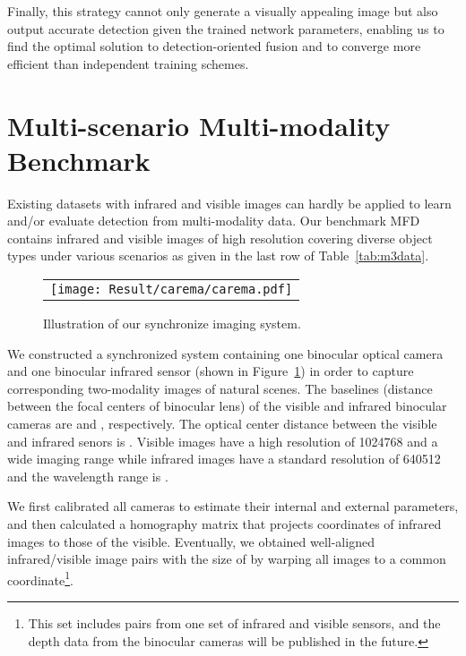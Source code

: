 \documentclass[10pt,twocolumn,letterpaper]{article}
\begin{document}
Finally, this strategy cannot only generate a visually appealing image but also output accurate detection given the trained network parameters, enabling us to find the optimal solution to detection-oriented fusion and to converge more efficient than independent training schemes.

\section{Multi-scenario Multi-modality Benchmark}
Existing datasets with infrared and visible images can hardly be applied to learn and/or evaluate detection from multi-modality data. Our benchmark MFD contains infrared and visible images of high resolution covering diverse object types under various scenarios as given in the last row of Table~\ref{tab:m3data}.
\begin{figure}[!htb]
	\centering
	\setlength{\tabcolsep}{1pt}
	\begin{tabular}{c}
		
		\texttt{[image: Result/carema/carema.pdf]}
		\\ 				
	\end{tabular}
	\vspace{-0.2cm}
	\caption{Illustration of our synchronize imaging system.}
	\label{fig:SYSTEM}
\end{figure}

We constructed a synchronized system containing one binocular optical camera and one binocular infrared sensor (shown in Figure~\ref{fig:SYSTEM}) in order to capture corresponding two-modality images of natural scenes. The baselines (distance between the focal centers of binocular lens) of the visible and infrared binocular cameras are  and , respectively. The optical center distance between the visible and infrared senors is . Visible images have a high resolution of 1024768 and a wide imaging range while infrared images have a standard resolution of 640512 and the wavelength range is .

We first calibrated all cameras to estimate their internal and external parameters, and then calculated a homography matrix that projects coordinates of infrared images to those of the visible. Eventually, we obtained well-aligned infrared/visible image pairs with the size of  by warping all images to a common coordinate\footnote{This set includes pairs from one set of infrared and visible sensors, and the depth data from the binocular cameras will be published in the future.}.
\end{document}

